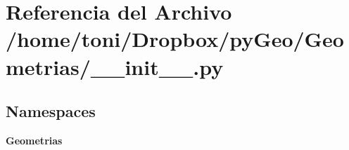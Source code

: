 \section{Referencia del Archivo /home/toni/\-Dropbox/py\-Geo/\-Geometrias/\-\_\-\-\_\-init\-\_\-\-\_\-.py}
\label{____init_____8py}
\subsection*{Namespaces}
\begin{DoxyCompactItemize}
\item 
{\bf Geometrias}
\end{DoxyCompactItemize}
